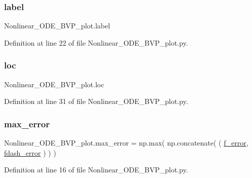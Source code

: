 \subsubsection{\texorpdfstring{label}{label}}
{\footnotesize\ttfamily Nonlinear\+\_\+\+O\+D\+E\+\_\+\+B\+V\+P\+\_\+plot.\+label}



Definition at line 22 of file Nonlinear\+\_\+\+O\+D\+E\+\_\+\+B\+V\+P\+\_\+plot.\+py.

\mbox{\label{namespaceNonlinear__ODE__BVP__plot_ae2778ff34d84d599493b00dc7ec51d5a}} 
\subsubsection{\texorpdfstring{loc}{loc}}
{\footnotesize\ttfamily Nonlinear\+\_\+\+O\+D\+E\+\_\+\+B\+V\+P\+\_\+plot.\+loc}



Definition at line 31 of file Nonlinear\+\_\+\+O\+D\+E\+\_\+\+B\+V\+P\+\_\+plot.\+py.

\mbox{\label{namespaceNonlinear__ODE__BVP__plot_ae862a80437e752743596a018fc0de10e}} 
\subsubsection{\texorpdfstring{max\+\_\+error}{max\_error}}
{\footnotesize\ttfamily Nonlinear\+\_\+\+O\+D\+E\+\_\+\+B\+V\+P\+\_\+plot.\+max\+\_\+error = np.\+max( np.\+concatenate( ( \hyperlink{namespaceNonlinear__ODE__BVP__plot_ac170b8ff53c4176fbe06ac0cc7b2f211}{f\+\_\+error}, \hyperlink{namespaceNonlinear__ODE__BVP__plot_a692d79c4c51e088bd93da3ba048a4e9d}{fdash\+\_\+error} ) ) )}



Definition at line 16 of file Nonlinear\+\_\+\+O\+D\+E\+\_\+\+B\+V\+P\+\_\+plot.\+py.

